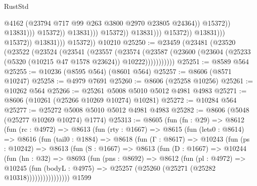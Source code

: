 \begin{lexlean}{RustStd}
\begin{coremodule}
                                                            @4162
                                                            (@23794
                                                              @717
                                                              @99
                                                              @263
                                                              @3800
                                                              @2970
                                                              @23805
                                                              @24364))
                                                          @15372))
                                                      @13831)))
                                                @15372))
                                            @13831)))
                                      @15372))
                                  @13831)))
                            @15372))
                        @13831)))
                  @15372))
              @13831)))
        @15372))
    @10210
@25250 := @23459
    (@23481
      (@23520
        (@23522
          (@23524
            (@23541
              (@23557
                (@23574
                  (@23587
                    (@23600 (@23604 (@25233 (@5320 (@10215 @47 @1578 @23624)) @10222)))))))))))
@25251 := @8589 @564
@25255 := @10236 (@8595 @564) (@8601 @564)
@25257 := @8606 (@8571 @10247)
@25258 := @4979 @7691
@25260 := @8606 (@25258 @10256)
@25261 := @10262 @564
@25266 := @25261 @5008 @5010 @5012 @4981 @4983
@25271 := @8606 (@10261 (@25266 @10269 @10274) @10281)
@25272 := @10284 @564
@25277 := @25272 @5008 @5010 @5012 @4981 @4983
@25282 := @8606 (@5048 (@25277 @10269 @10274) @1774)
@25313 := @8605
    (fun (fn : @29) =>
    @8612
      (fun (rc : @4972) =>
      @8613
        (fun (rty : @1667) =>
        @8615
          (fun (lets0 : @8614) =>
          @8616
            (fun (tail0 : @1884) =>
            @8618
              (fun (Γ : @8617) =>
              @10243
                (fun (ps : @10242) =>
                @8613
                  (fun (S : @1667) =>
                  @8613
                    (fun (D : @1667) =>
                    @10244
                      (fun (hn : @32) =>
                      @8693
                        (fun (pns : @8692) =>
                        @8612
                          (fun (pl : @4972) =>
                          @10245
                            (fun (bodyL : @4975) =>
                            @25257 (@25260 (@25271 (@25282 @10318))))))))))))))))
    @1599

\end{coremodule}
\end{lexlean}
